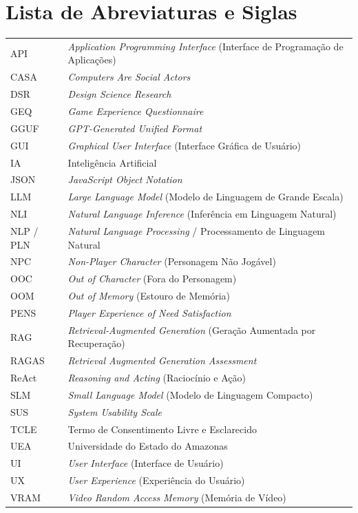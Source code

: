 \documentclass[12pt,a4paper,oneside]{report}
\begin{document}
\newpage
\chapter*{Lista de Abreviaturas e Siglas}
\begin{tabular}{ll}
API & \textit{Application Programming Interface} (Interface de Programação de Aplicações) \\
CASA & \textit{Computers Are Social Actors} \\
DSR & \textit{Design Science Research} \\
GEQ & \textit{Game Experience Questionnaire} \\
GGUF & \textit{GPT-Generated Unified Format} \\
GUI & \textit{Graphical User Interface} (Interface Gráfica de Usuário) \\
IA & Inteligência Artificial \\
JSON & \textit{JavaScript Object Notation} \\
LLM & \textit{Large Language Model} (Modelo de Linguagem de Grande Escala) \\
NLI & \textit{Natural Language Inference} (Inferência em Linguagem Natural) \\
NLP / PLN & \textit{Natural Language Processing} / Processamento de Linguagem Natural \\
NPC & \textit{Non-Player Character} (Personagem Não Jogável) \\
OOC & \textit{Out of Character} (Fora do Personagem) \\
OOM & \textit{Out of Memory} (Estouro de Memória) \\
PENS & \textit{Player Experience of Need Satisfaction} \\
RAG & \textit{Retrieval-Augmented Generation} (Geração Aumentada por Recuperação) \\
RAGAS & \textit{Retrieval Augmented Generation Assessment} \\
ReAct & \textit{Reasoning and Acting} (Raciocínio e Ação) \\
SLM & \textit{Small Language Model} (Modelo de Linguagem Compacto) \\
SUS & \textit{System Usability Scale} \\
TCLE & Termo de Consentimento Livre e Esclarecido \\
UEA & Universidade do Estado do Amazonas \\
UI & \textit{User Interface} (Interface de Usuário) \\
UX & \textit{User Experience} (Experiência do Usuário) \\
VRAM & \textit{Video Random Access Memory} (Memória de Vídeo) \\
\end{tabular}
\end{document}

